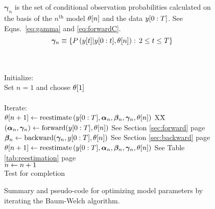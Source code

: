 \begin{figure}[htbp]
\begin{center}
{\begin{minipage}{0.90\textwidth}
\begin{tabbing}
\begin{minipage}[b]{1.0\textwidth}
\begin{equation*}
         \end{equation*}
      \end{minipage}\\ \\%
      \begin{minipage}[b]{1.0\textwidth}
         $\bm{\gamma}_n$ is the set of conditional observation probabilities
         calculated on the basis of the $n^{\text{th}}$ model ${\theta}{[n]}$ and
         the data $y[0:T]$.  See Eqns.~\eqref{eq:gamma} and
         \eqref{eq:forwardC}.
         \begin{equation*}
         \bm{\gamma}_n \equiv \left\{P \left({y}{[t]} | y[0:t],
         {\theta}{[n]}\right) : \, 2 \leq t \leq T \right\}
         \end{equation*}
      \end{minipage}\\ \\%
      \<\-
      Initialize: \> \+ \\
      Set $n=1$ and choose ${\theta}{[1]}$\\ \\ \< \-
      Iterate: \> \+ \\
      ${\theta}{[n+1]} \leftarrow \text{reestimate} \left( y[0:T],
      \bm{\alpha}_n, \bm{\beta}_n, \bm{\gamma}_n, {\theta}{[n]}\right)$ XX\= \kill
      $\left(\bm{\alpha}_n,\bm{\gamma}_n\right) \leftarrow
      \text{forward}(y[0:T],{\theta}{[n]})$ \> See Section
      \ref{sec:forward} page \pageref{sec:forward}\\
      $\bm{\beta}_n \leftarrow \text{backward}(\bm{\gamma}_n, y[0:T],
      {\theta}{[n]})$ \> See Section \ref{sec:backward}  page \pageref{sec:backward}\\
      ${\theta}{[n+1]} \leftarrow \text{reestimate} \left( y[0:T],
      \bm{\alpha}_n, \bm{\beta}_n, \bm{\gamma}_n, {\theta}{[n]}\right)$ \> See Table
      \ref{tab:reestimation} page \pageref{tab:reestimation} \\
      $n \leftarrow n+1$ \\
      Test for completion
    \end{tabbing}
  \end{minipage}
}
\caption[Baum-Welch model parameter optimization.]%
{Summary and pseudo-code for optimizing model parameters by iterating
  the Baum-Welch algorithm. }
    \label{fig:train}
  \end{center}
\end{figure}

